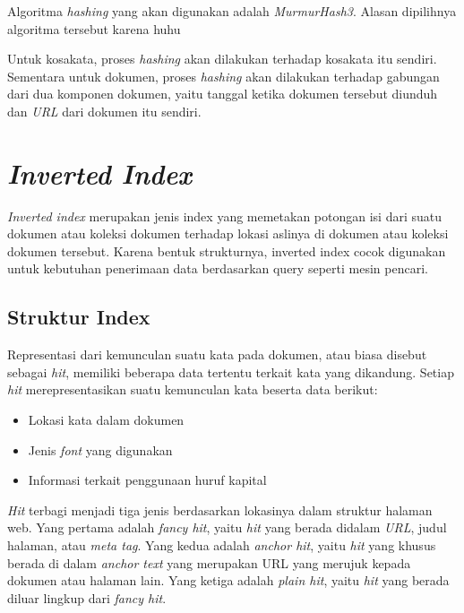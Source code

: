 Algoritma \textit{hashing} yang akan digunakan adalah \textit{MurmurHash3}.
Alasan dipilihnya algoritma tersebut karena huhu

Untuk kosakata, proses \textit{hashing} akan dilakukan terhadap kosakata itu
sendiri. Sementara untuk dokumen, proses \textit{hashing} akan dilakukan terhadap
gabungan dari dua komponen dokumen, yaitu tanggal ketika dokumen tersebut
diunduh dan \textit{URL} dari dokumen itu sendiri.

\section{\emph{Inverted Index}}

\emph{Inverted index} merupakan jenis index yang memetakan potongan isi dari
suatu dokumen atau koleksi dokumen terhadap lokasi aslinya di dokumen atau
koleksi dokumen tersebut. Karena bentuk strukturnya, inverted index cocok
digunakan untuk kebutuhan penerimaan data berdasarkan query seperti mesin
pencari.

\subsection{Struktur Index}

Representasi dari kemunculan suatu kata pada dokumen, atau biasa disebut sebagai
\emph{hit}, memiliki beberapa data tertentu terkait kata yang dikandung. Setiap
\emph{hit} merepresentasikan suatu kemunculan kata beserta data berikut:

\begin{itemize}
  \item{Lokasi kata dalam dokumen}
  \item{Jenis \emph{font} yang digunakan}
  \item{Informasi terkait penggunaan huruf kapital}
\end{itemize}

\emph{Hit} terbagi menjadi tiga jenis berdasarkan lokasinya dalam struktur
halaman web. Yang pertama adalah \emph{fancy hit}, yaitu \emph{hit} yang berada
didalam \emph{URL}, judul halaman, atau \emph{meta tag}. Yang kedua adalah
\emph{anchor hit}, yaitu \emph{hit} yang khusus berada di dalam
\emph{anchor text} yang merupakan URL yang merujuk kepada dokumen atau halaman
lain. Yang ketiga adalah \emph{plain hit}, yaitu \emph{hit} yang berada diluar
lingkup dari \emph{fancy hit}.

